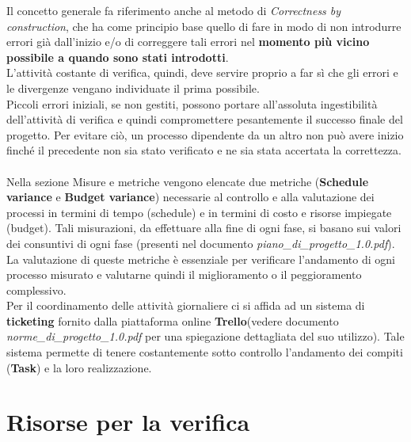 \documentclass[a4paper,11pt]{article}
\begin{document}
Il concetto generale fa riferimento anche al metodo di \textit{Correctness by construction}, che ha come principio base quello di fare in modo di non introdurre errori già dall'inizio e/o di correggere tali errori nel \textbf{momento più vicino possibile a quando sono stati introdotti}.\\ L'attività costante di verifica, quindi,  deve servire proprio a far sì che gli errori e le divergenze vengano individuate il prima possibile.\\
Piccoli errori iniziali, se non gestiti, possono portare all'assoluta ingestibilità dell'attività di verifica e quindi compromettere pesantemente il successo finale del progetto. Per evitare ciò, un processo dipendente da un altro non può avere inizio finché il precedente non sia stato verificato e ne sia stata accertata la correttezza.\\\\ %
Nella sezione Misure e metriche vengono elencate due metriche (\textbf{Schedule variance} e \textbf{Budget variance}) necessarie al controllo e alla valutazione dei processi in termini di tempo (schedule) e in termini di costo e risorse impiegate (budget). 
Tali misurazioni, da effettuare alla fine di ogni fase, si basano sui valori dei consuntivi di ogni fase (presenti nel documento \textit{piano\_di\_progetto\_1.0.pdf}). La valutazione di queste metriche è essenziale per verificare l'andamento di ogni processo misurato e valutarne quindi il miglioramento o il peggioramento complessivo. \\
Per il coordinamento delle attività giornaliere ci si affida ad un sistema di \textbf{ticketing\addglos} fornito dalla piattaforma online \textbf{Trello}\addglos (vedere documento \textit{norme\_di\_progetto\_1.0.pdf} per una spiegazione dettagliata del suo utilizzo). Tale sistema permette di tenere costantemente sotto controllo l'andamento dei compiti (\textbf{Task}\addglos) e la loro realizzazione. 

\newpage
\section{Risorse per la verifica}
\end{document}
